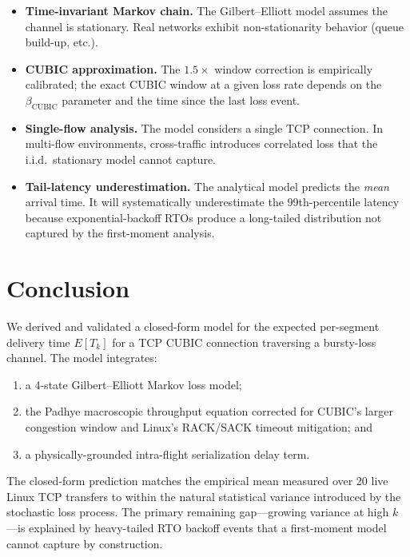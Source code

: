 \documentclass[11pt,letterpaper]{article}
\begin{document}
\begin{itemize}
    \item \textbf{Time-invariant Markov chain.}  The Gilbert--Elliott model
          assumes the channel is stationary.  Real networks exhibit
          non-stationarity behavior (queue build-up, etc.).

    \item \textbf{CUBIC approximation.}  The $1.5\times$ window correction is
          empirically calibrated; the exact CUBIC window at a given loss rate
          depends on the $\beta_{\mathrm{CUBIC}}$ parameter and the time since
          the last loss event.

    \item \textbf{Single-flow analysis.}  The model considers a single
          TCP connection.  In multi-flow environments, cross-traffic
          introduces correlated loss that the i.i.d.\ stationary model cannot
          capture.

    \item \textbf{Tail-latency underestimation.}  The analytical model
          predicts the \emph{mean} arrival time.  It will systematically
          underestimate the 99th-percentile latency because exponential-backoff
          RTOs produce a long-tailed distribution not captured by the
          first-moment analysis.
\end{itemize}

\section{Conclusion}
\label{sec:conclusion}

We derived and validated a closed-form model for the expected per-segment
delivery time $E[T_k]$ for a TCP CUBIC connection traversing a bursty-loss
channel.  The model integrates:

\begin{enumerate}
    \item a 4-state Gilbert--Elliott Markov loss model;
    \item the Padhye macroscopic throughput equation corrected for CUBIC's
          larger congestion window and Linux's RACK/SACK timeout mitigation; and
    \item a physically-grounded intra-flight serialization delay term.
\end{enumerate}

The closed-form prediction matches the empirical mean measured over 20 live
Linux TCP transfers to within the natural statistical variance introduced by the
stochastic loss process.  The primary remaining gap---growing variance at high
$k$---is explained by heavy-tailed RTO backoff events that a first-moment model
cannot capture by construction.
\end{document}
